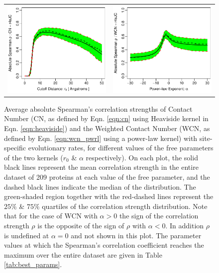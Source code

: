 \documentclass[11pt]{article}
\begin{document}
    \begin{figure}
        \begin{center}
        \begin{tabular}{cc}
            \includegraphics[width=3.3in]{../../wcn_best_definition/analysis/figures/get_quantiles/screen_plots/spcor_cnSC_r4sJC.pdf} & \includegraphics[width=3.3in]{../../wcn_best_definition/analysis/figures/get_quantiles/screen_plots/spcor_wcnpSC_r4sJC.pdf}
        \end{tabular}
        \end{center}
        \caption{Average absolute Spearman's correlation strengths of Contact Number (CN, as defined by Eqn. \ref{eqn:cn} using Heaviside kernel in Eqn. \ref{eqn:heaviside}) and the Weighted Contact Number (WCN, as defined by Eqn. \ref{eqn:wcn_pwrl} using a power-law kernel) with site-specific evolutionary rates, for different values of the free parameters of the two kernels ($r_0$ \& $\alpha$ respectively). On each plot, the solid black lines represent the mean correlation strength in the entire dataset of 209 proteins at each value of the free parameter, and the dashed black lines indicate the median of the distribution. The green-shaded region together with the red-dashed lines represent the $25\%$ \& $75\%$ quartiles of the correlation strength distribution. Note that for the case of WCN with $\alpha>0$ the sign of the correlation strength $\rho$ is the opposite of the sign of $\rho$ with $\alpha<0$. In addition $\rho$ is undefined at $\alpha=0$ and not shown in this plot.  The parameter values at which the Spearman's correlation coefficient reaches the maximum over the entire dataset are given in Table \ref{tab:best_params}.}
        \label{fig:cnwcnp}
    \end{figure}
\end{document}
